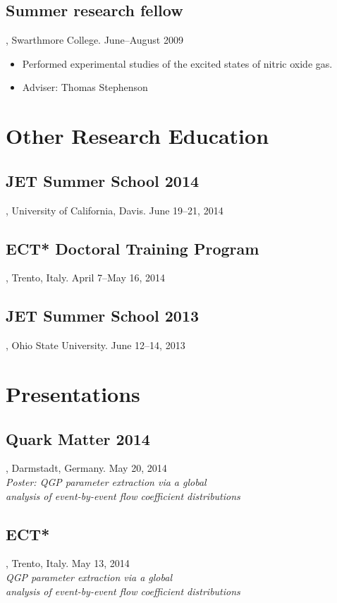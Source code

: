 \documentclass[letterpaper,10pt]{article}
\begin{document}
\subsection{Summer research fellow}, Swarthmore College. \hfill June--August 2009

\begin{itemize}
  \item Performed experimental studies of the excited states of nitric oxide gas.
  \item Adviser:  Thomas Stephenson
\end{itemize}



\pagebreak



\section{Other Research Education}

\subsection{JET Summer School 2014}, University of California, Davis. \hfill June 19--21, 2014
\subsection{ECT* Doctoral Training Program}, Trento, Italy. \hfill April 7--May 16, 2014
\subsection{JET Summer School 2013}, Ohio State University. \hfill June 12--14, 2013



\section{Presentations}

\subsection{Quark Matter 2014}, Darmstadt, Germany. \hfill May 20, 2014 \\
\emph{Poster: QGP parameter extraction via a global \\ analysis of event-by-event flow coefficient distributions}

\subsection{ECT*}, Trento, Italy. \hfill May 13, 2014 \\
\emph{QGP parameter extraction via a global \\ analysis of event-by-event flow coefficient distributions}
\end{document}

